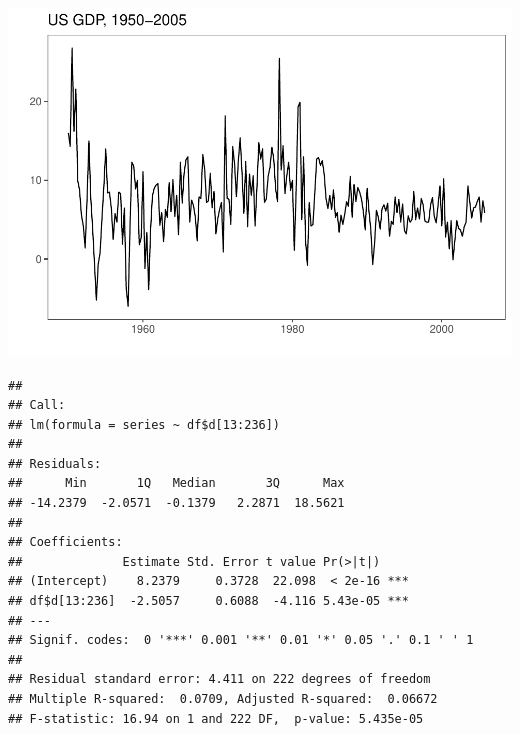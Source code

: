 \documentclass[11pt, a4paper]{report}
\newenvironment{Shaded}{\begin{snugshade}}{\end{snugshade}}
\newcommand{\CommentTok}[1]{\textcolor[rgb]{0.56,0.35,0.01}{\textit{#1}}}
\newcommand{\DataTypeTok}[1]{\textcolor[rgb]{0.13,0.29,0.53}{#1}}
\newcommand{\DecValTok}[1]{\textcolor[rgb]{0.00,0.00,0.81}{#1}}
\newcommand{\KeywordTok}[1]{\textcolor[rgb]{0.13,0.29,0.53}{\textbf{#1}}}
\newcommand{\NormalTok}[1]{#1}
\newcommand{\OperatorTok}[1]{\textcolor[rgb]{0.81,0.36,0.00}{\textbf{#1}}}
\newcommand{\StringTok}[1]{\textcolor[rgb]{0.31,0.60,0.02}{#1}}
\theoremstyle{plain}
\theoremstyle{plain}
\theoremstyle{remark}
\begin{document}
\begin{center}\includegraphics{Econo2_P7_files/figure-latex/all-1} \end{center}

\begin{Shaded}
\end{Shaded}

\begin{verbatim}
## 
## Call:
## lm(formula = series ~ df$d[13:236])
## 
## Residuals:
##      Min       1Q   Median       3Q      Max 
## -14.2379  -2.0571  -0.1379   2.2871  18.5621 
## 
## Coefficients:
##              Estimate Std. Error t value Pr(>|t|)    
## (Intercept)    8.2379     0.3728  22.098  < 2e-16 ***
## df$d[13:236]  -2.5057     0.6088  -4.116 5.43e-05 ***
## ---
## Signif. codes:  0 '***' 0.001 '**' 0.01 '*' 0.05 '.' 0.1 ' ' 1
## 
## Residual standard error: 4.411 on 222 degrees of freedom
## Multiple R-squared:  0.0709, Adjusted R-squared:  0.06672 
## F-statistic: 16.94 on 1 and 222 DF,  p-value: 5.435e-05
\end{verbatim}
\end{document}

